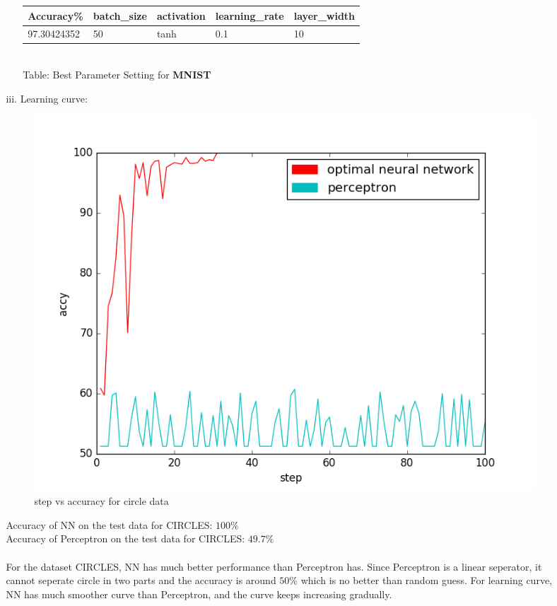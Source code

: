 \begin{enumerate}
\begin{enumerate}
\begin{enumerate}
\begin{enumerate}
\begin{center}
\begin{tabular}{|l|l|l|l|l|}
		\hline
		Accuracy\% & batch\_size & activation     & learning\_rate       & layer\_width   \\ \hline\hline
		97.30424352 & 50  & tanh & 0.1  & 10 \\ \hline
		\end{tabular}
		\\Table: Best Parameter Setting for \textbf{MNIST}\\
		\end{center}
		\end{enumerate}
		\pagebreak
		\item[iii.] Learning curve:
			\begin{figure}[H]
				\includegraphics[width=\linewidth]{figure_circles.png}
				\caption{step vs accuracy for circle data}
			\end{figure}
			Accuracy of NN on the test data for CIRCLES: $100\%$\\
			Accuracy of Perceptron on the test data for CIRCLES: $49.7\%$\\\\
			For the dataset CIRCLES, NN has much better performance than Perceptron has. Since Perceptron is a linear seperator, it cannot seperate circle in two parts and the accuracy is around $50\%$ which is no better than random guess. For learning curve, NN has much smoother curve than Perceptron, and the curve keeps increasing gradually.
			\begin{figure}[H]

\end{figure}
\end{enumerate}
\end{enumerate}
\end{enumerate}
